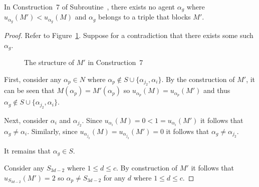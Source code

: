 \begin{lem}
\label{lem:threed_sr_as_symmetric_binary_algocase7noalphapexists}
In Construction~7 of Subroutine~, there exists no agent $\alpha_{g}$ where $u_{\alpha_{g}}(M') < u_{\alpha_{g}}(M)$ and $\alpha_g$ belongs to a triple that blocks $M'$.
\end{lem}
\begin{proof}

Refer to Figure~\ref{fig:threed_sr_as_symmetric_binary_repair_algorithm_7_cases_case_7}. Suppose for a contradiction that there exists some such $\alpha_g$.

\begin{figure}
    \centering
    
    \caption{The structure of $M'$ in Construction~7} 
    \label{fig:threed_sr_as_symmetric_binary_repair_algorithm_7_cases_case_7}
\end{figure}

First, consider any $\alpha_p \in N$ where $\alpha_p \notin S \cup \{ \alpha_{j_2}, \alpha_{i} \}$. By the construction of $M'$, it can be seen that $M(\alpha_p)=M'(\alpha_p)$ so $u_{\alpha_p}(M)=u_{\alpha_p}(M')$ and thus $\alpha_g \notin S \cup \{ \alpha_{j_2}, \alpha_{i} \}$.

Next, consider $\alpha_i$ and $\alpha_{j_2}$. Since $u_{\alpha_i}(M) = 0 < 1 = u_{\alpha_i}(M')$ it follows that $\alpha_g \neq \alpha_i$.  Similarly, since $u_{\alpha_{j_2}}(M) = u_{\alpha_{j_2}}(M') = 0$ it follows that $\alpha_g \neq \alpha_{j_2}$.

It remains that $\alpha_g \in S$.

Consider any $S_{3d-2}$ where $1\leq d\leq c$. By construction of $M'$ it follows that $u_{S_{3d-2}}(M')=2$ so $\alpha_{p} \neq S_{3d-2}$ for any $d$ where $1\leq d\leq c$.


\end{proof}
